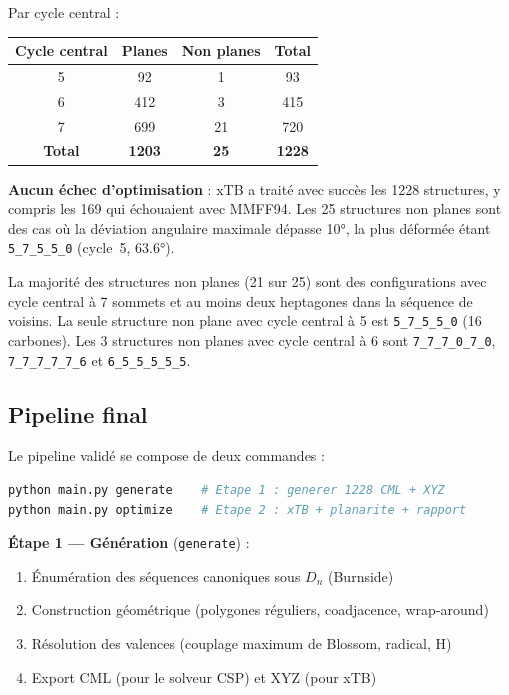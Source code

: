 \documentclass[a4paper,12pt]{article}
\begin{document}
Par cycle central :
\begin{center}
\begin{tabular}{cccc}
  \toprule
  Cycle central & Planes & Non planes & Total \\
  \midrule
  5 & 92  & 1  & 93 \\
  6 & 412 & 3  & 415 \\
  7 & 699 & 21 & 720 \\
  \midrule
  \textbf{Total} & \textbf{1203} & \textbf{25} & \textbf{1228} \\
  \bottomrule
\end{tabular}
\end{center}

\textbf{Aucun échec d'optimisation} : xTB a traité avec succès les 1228 structures, y compris
les 169 qui échouaient avec MMFF94. Les 25 structures non planes sont des cas où la déviation
angulaire maximale dépasse 10°, la plus déformée étant \texttt{5\_7\_5\_5\_0} (cycle~5, 63.6°).

\begin{remarque}
  La majorité des structures non planes (21 sur 25) sont des configurations avec cycle
  central à 7 sommets et au moins deux heptagones dans la séquence de voisins. La seule
  structure non plane avec cycle central à 5 est \texttt{5\_7\_5\_5\_0} (16 carbones).
  Les 3 structures non planes avec cycle central à 6 sont \texttt{7\_7\_7\_0\_7\_0},
  \texttt{7\_7\_7\_7\_7\_6} et \texttt{6\_5\_5\_5\_5\_5}.
\end{remarque}

\subsection{Pipeline final}

Le pipeline validé se compose de deux commandes :

\begin{lstlisting}[language=bash, style={}]
python main.py generate    # Etape 1 : generer 1228 CML + XYZ
python main.py optimize    # Etape 2 : xTB + planarite + rapport
\end{lstlisting}

\textbf{Étape 1 — Génération} (\texttt{generate}) :
\begin{enumerate}
  \item Énumération des séquences canoniques sous $D_n$ (Burnside)
  \item Construction géométrique (polygones réguliers, coadjacence, wrap-around)
  \item Résolution des valences (couplage maximum de Blossom, radical, H)
  \item Export CML (pour le solveur CSP) et XYZ (pour xTB)
\end{enumerate}
\end{document}
